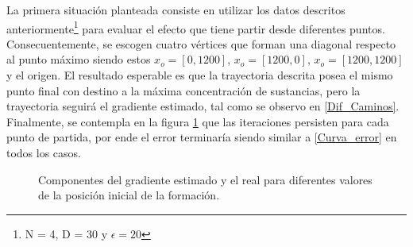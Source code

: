 La primera situación planteada consiste en utilizar los datos descritos anteriormente\footnote[2]{N = 4, D = 30 y $\epsilon=20$} para evaluar el efecto que tiene partir desde diferentes puntos. Consecuentemente, se escogen cuatro vértices que forman una diagonal respecto al punto máximo siendo estos $x_o=[0,1200]$, $x_o=[1200,0]$, $x_o=[1200,1200]$ y el origen. El resultado esperable es que la trayectoria descrita posea el mismo punto final con destino a la máxima concentración de sustancias, pero la trayectoria seguirá el gradiente estimado, tal como se observo en \ref{Dif_Caminos}. Finalmente, se contempla en la figura \ref{Gradiente_Diversos_Puntos} que las iteraciones persisten para cada punto de partida, por ende el error terminaría siendo similar a \ref{Curva_error} en todos los casos. 

\begin{figure}[H]
  \begin{center}
    \caption{Componentes del gradiente estimado y el real para diferentes valores de la posición inicial de la formación.}
    \label{Gradiente_Diversos_Puntos}
  \end{center}
\end{figure}

